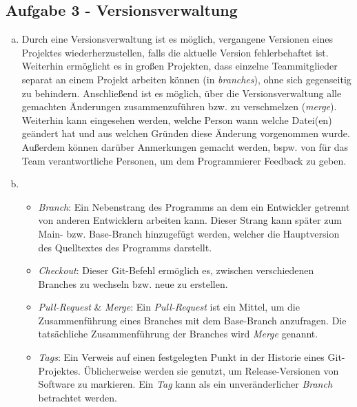 \subsection{Aufgabe 3 - Versionsverwaltung}

\begin{enumerate}[(a)]
	\item Durch eine Versionsverwaltung ist es möglich, vergangene Versionen eines Projektes wiederherzustellen, falls die aktuelle Version fehlerbehaftet ist. Weiterhin ermöglicht es in großen Projekten, dass einzelne Teammitglieder separat an einem Projekt arbeiten können (in \emph{branches}), ohne sich gegenseitig zu behindern. Anschließend ist es möglich, über die Versionsverwaltung alle gemachten Änderungen zusammenzuführen bzw. zu verschmelzen (\emph{merge}). Weiterhin kann eingesehen werden, welche Person wann welche Datei(en) geändert hat und aus welchen Gründen diese Änderung vorgenommen wurde. Außerdem können darüber Anmerkungen gemacht werden, bspw. von für das Team verantwortliche Personen, um dem Programmierer Feedback zu geben.
	
	\item 
	\begin{itemize}
		\item \emph{Branch}: Ein Nebenstrang des Programms an dem ein Entwickler getrennt von anderen Entwicklern arbeiten kann. Dieser Strang kann später zum Main- bzw. Base-Branch hinzugefügt werden, welcher die Hauptversion des Quelltextes des Programms darstellt.
		\item \emph{Checkout}: Dieser Git-Befehl ermöglich es, zwischen verschiedenen Branches zu wechseln bzw. neue zu erstellen.
		\item \emph{Pull-Request} \& \emph{Merge}: Ein \emph{Pull-Request} ist ein Mittel, um die Zusammenführung eines Branches mit dem Base-Branch anzufragen. Die tatsächliche Zusammenführung der Branches wird \emph{Merge} genannt.
		\item \emph{Tags}: Ein Verweis auf einen festgelegten Punkt in der Historie eines Git-Projektes. Üblicherweise werden sie genutzt, um Release-Versionen von Software zu markieren. Ein \emph{Tag} kann als ein unveränderlicher \emph{Branch} betrachtet werden.
	\end{itemize}
	

\end{enumerate}

